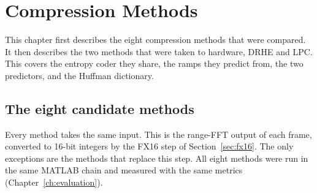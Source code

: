 \chapter{Compression Methods}
\label{ch:methods}

This chapter first describes the eight compression methods that were compared.
It then describes the two methods that were taken to hardware, DRHE and LPC.
This covers the entropy coder they share, the ramps they predict from, the two
predictors, and the Huffman dictionary.

\section{The eight candidate methods}
\label{sec:candidates}

Every method takes the same input. This is the range-FFT output of each frame,
converted to 16-bit integers by the FX16 step of Section~\ref{sec:fx16}. The
only exceptions are the methods that replace this step. All eight methods were
run in the same MATLAB chain and measured with the same metrics
(Chapter~\ref{ch:evaluation}).

